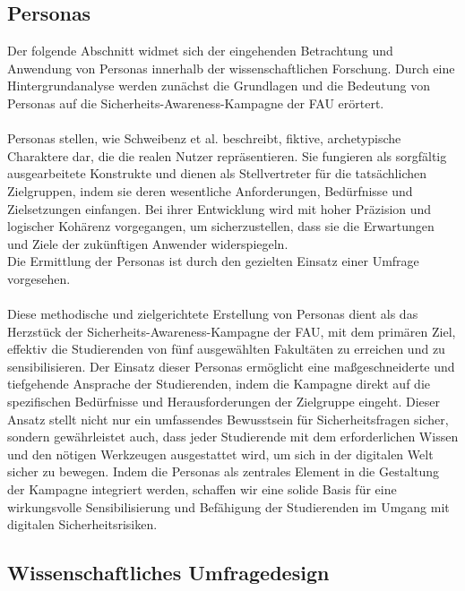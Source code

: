 \documentclass[german,report]{i1thesis}
\begin{document}
\subsection{Personas}
\label{sec:personas}
Der folgende Abschnitt widmet sich der eingehenden Betrachtung und Anwendung von Personas innerhalb der wissenschaftlichen Forschung. Durch eine Hintergrundanalyse werden zunächst die Grundlagen und die Bedeutung von Personas auf die Sicherheits-Awareness-Kampagne der FAU erörtert.\\
\\
Personas stellen, wie Schweibenz et al. \cite{Schweibenz} beschreibt, fiktive, archetypische Charaktere dar, die die realen Nutzer repräsentieren. Sie fungieren als sorgfältig ausgearbeitete Konstrukte und dienen als Stellvertreter für die tatsächlichen Zielgruppen, indem sie deren wesentliche Anforderungen, Bedürfnisse und Zielsetzungen einfangen. Bei ihrer Entwicklung wird mit hoher Präzision und logischer Kohärenz vorgegangen, um sicherzustellen, dass sie die Erwartungen und Ziele der zukünftigen Anwender widerspiegeln.\\
Die Ermittlung der Personas ist durch den gezielten Einsatz einer Umfrage vorgesehen.\\
\\
Diese methodische und zielgerichtete Erstellung von Personas dient als das Herzstück der Sicherheits-Awareness-Kampagne der FAU, mit dem primären Ziel, effektiv die Studierenden von fünf ausgewählten Fakultäten zu erreichen und zu sensibilisieren. Der Einsatz dieser Personas ermöglicht eine maßgeschneiderte und tiefgehende Ansprache der Studierenden, indem die Kampagne direkt auf die spezifischen Bedürfnisse und Herausforderungen der Zielgruppe eingeht. Dieser Ansatz stellt nicht nur ein umfassendes Bewusstsein für Sicherheitsfragen sicher, sondern gewährleistet auch, dass jeder Studierende mit dem erforderlichen Wissen und den nötigen Werkzeugen ausgestattet wird, um sich in der digitalen Welt sicher zu bewegen. Indem die Personas als zentrales Element in die Gestaltung der Kampagne integriert werden, schaffen wir eine solide Basis für eine wirkungsvolle Sensibilisierung und Befähigung der Studierenden im Umgang mit digitalen Sicherheitsrisiken.

\subsection{Wissenschaftliches Umfragedesign}
\label{sec:survey_design}
\end{document}
